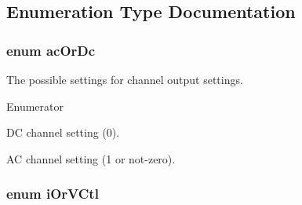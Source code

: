 \subsection{Enumeration Type Documentation}
\hypertarget{a00020_a067edf486f2115dfa74e51ce43cfdfa6}{
\subsubsection[{ac\-Or\-Dc}]{\setlength{\rightskip}{0pt plus 5cm}enum {\bf ac\-Or\-Dc}}}\label{a00020_a067edf486f2115dfa74e51ce43cfdfa6}
The possible settings for channel output settings. \begin{Desc}
\item[Enumerator]\par
\begin{description}
\item[{\em 
\hypertarget{a00020_a067edf486f2115dfa74e51ce43cfdfa6a22e2e72997ac4289587cadae38cc561e}{dc}\label{a00020_a067edf486f2115dfa74e51ce43cfdfa6a22e2e72997ac4289587cadae38cc561e}
}]D\-C channel setting (0). \item[{\em 
\hypertarget{a00020_a067edf486f2115dfa74e51ce43cfdfa6ae13614f9b874b4bbeb45317b280ae5f0}{ac}\label{a00020_a067edf486f2115dfa74e51ce43cfdfa6ae13614f9b874b4bbeb45317b280ae5f0}
}]A\-C channel setting (1 or not-\/zero). \end{description}
\end{Desc}
\hypertarget{a00020_a717a050513c9f1668fa40e08c4d5e78f}{
\subsubsection[{i\-Or\-V\-Ctl}]{\setlength{\rightskip}{0pt plus 5cm}enum {\bf i\-Or\-V\-Ctl}}}\label{a00020_a717a050513c9f1668fa40e08c4d5e78f}
